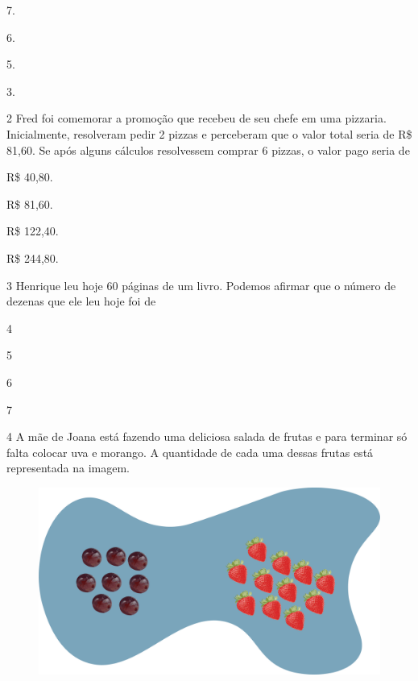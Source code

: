 \begin{escolha}
\item
  7.
\item
  6.
\item
  5.
\item
  3.
\end{escolha}

\num{2} Fred foi comemorar a promoção que recebeu de seu chefe em uma pizzaria. Inicialmente, resolveram pedir 2 pizzas e perceberam que o valor total seria de R\$ 81,60. Se após alguns cálculos resolvessem comprar 6
pizzas, o valor pago seria de


\begin{escolha}
\item
  R\$ 40,80.
\item
  R\$ 81,60.
\item
  R\$ 122,40.
\item
  R\$ 244,80.
\end{escolha}


\num{3} Henrique leu hoje 60 páginas de um livro. Podemos afirmar que o número de dezenas que ele leu hoje foi de

\begin{multicols}{2}
\begin{escolha}
\item
  4
\item
  5
\item
  6
\item
  7
\end{escolha}
\end{multicols}

\pagebreak
\num{4} A mãe de Joana está fazendo uma deliciosa salada de frutas e para terminar só falta colocar uva e morango. A quantidade de cada uma dessas frutas está representada na imagem.

\begin{figure}[htpb!]
\centering
\includegraphics[width=.8\textwidth]{./media/image114.png}
\end{figure}

